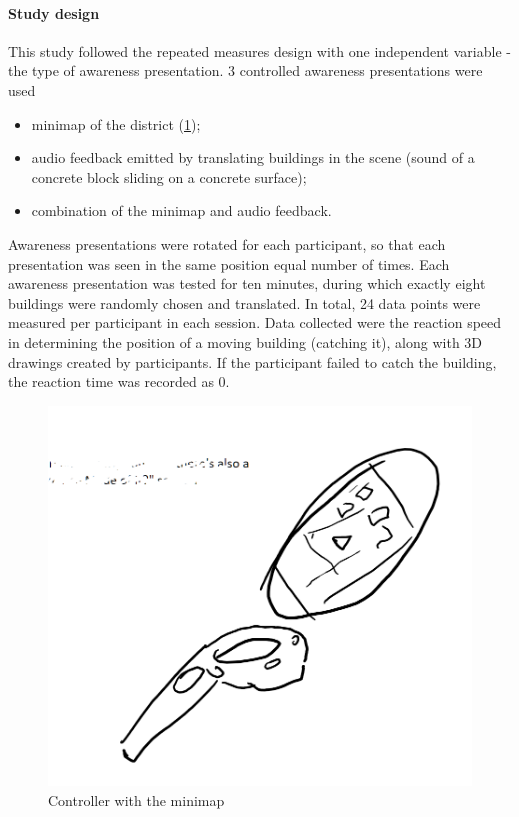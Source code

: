
\paragraph{Study design}
This study followed the repeated measures design with one independent variable - the type of awareness presentation. 3 controlled awareness presentations were used
\begin{itemize}
	\item minimap of the district (\ref{fig:minimap_controller});
	\item audio feedback emitted by translating buildings in the scene (sound of a concrete block sliding on a concrete surface);
	\item combination of the minimap and audio feedback.
\end{itemize}

Awareness presentations were rotated for each participant, so that each presentation was seen in the same position equal number of times. 
Each awareness presentation was tested for ten minutes, during which exactly eight buildings were randomly chosen and translated. In total, 24 data points were measured per participant in each session. Data collected were the reaction speed in determining the position of a moving building (catching it), along with 3D drawings created by participants. If the participant failed to catch the building, the reaction time was recorded as 0.

\begin{figure}[h]
	\centering
	\includegraphics[width=0.7\linewidth]{figures/placeholders/minimap_controller}
	\caption{Controller with the minimap}
	\label{fig:minimap_controller}
\end{figure}

